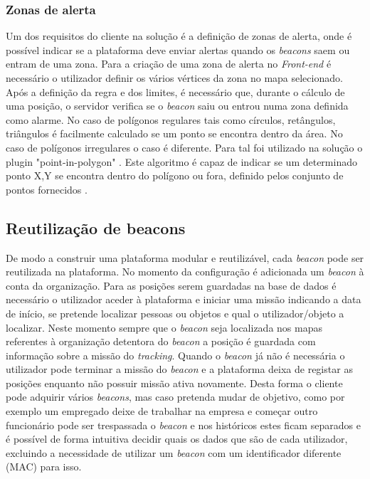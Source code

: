 \subsubsection{Zonas de alerta}

\par Um dos requisitos do cliente na solução é a definição de zonas de alerta, onde é possível indicar se a plataforma deve enviar alertas quando os \textit{beacons} saem ou entram de uma zona. Para a criação de uma zona de alerta no \textit{Front-end} é necessário o utilizador definir os vários vértices da zona no mapa selecionado. Após a definição da regra e dos limites, é necessário que, durante o cálculo de uma posição, o servidor verifica se o \textit{beacon} saiu ou entrou numa zona definida como alarme. No caso de polígonos regulares tais como círculos, retângulos, triângulos é facilmente calculado se um ponto se encontra dentro da área. No caso de polígonos irregulares o caso é diferente. Para tal foi utilizado na solução o plugin "point-in-polygon" \cite {pointpoint}. Este algoritmo é capaz de indicar se um determinado ponto X,Y se encontra dentro do polígono ou fora, definido pelos conjunto de pontos fornecidos .

\subsection{Reutilização de beacons}

\par De modo a construir uma plataforma modular e reutilizável, cada \textit{beacon} pode ser reutilizada na plataforma. No momento da configuração é adicionada um \textit{beacon} à conta da organização. Para as posições serem guardadas na base de dados é necessário o utilizador aceder à plataforma e iniciar uma missão indicando a data de início, se pretende localizar pessoas ou objetos e qual o utilizador/objeto a localizar. Neste momento sempre que o \textit{beacon} seja localizada nos mapas referentes à organização detentora do \textit{beacon} a posição é guardada com informação sobre a missão do \textit{tracking}. Quando o \textit{beacon} já não é necessária o utilizador pode terminar a missão do \textit{beacon} e a plataforma deixa de registar as posições enquanto não possuir missão ativa novamente. Desta forma o cliente pode adquirir vários \textit{beacons}, mas caso pretenda mudar de objetivo, como por exemplo um empregado deixe de trabalhar na empresa e começar outro funcionário pode ser trespassada o \textit{beacon} e nos históricos estes ficam separados e é possível de forma intuitiva decidir quais os dados que são de cada utilizador, excluindo a necessidade de utilizar um \textit{beacon} com um identificador diferente (MAC) para isso.
\par
